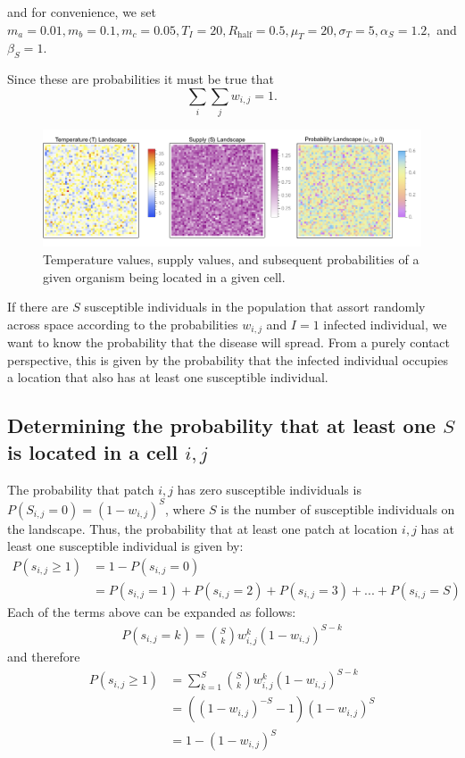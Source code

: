 \documentclass[11pt]{article}
\begin{document}
and for convenience, we set $m_a = 0.01, m_b = 0.1, m_c = 0.05, T_I = 20, R_{\text{half}} = 0.5, \mu_T = 20, \sigma_ T = 5, \alpha_S = 1.2, $ and $\beta_S = 1$. 

Since these are probabilities it must be true that 
\begin{equation}
\sum_i \sum_j w_{i,j}=1.
\end{equation}

\begin{figure}[!hpt]
    \centering
    \includegraphics[width=0.9\linewidth]{figs/temp-supply-probability-landscape.pdf}
    \caption{Temperature values, supply values, and subsequent probabilities of a given organism being located in a given cell.}
    \label{fig:t-s-wij-grid}
\end{figure}

If there are $S$ susceptible individuals in the population that assort randomly across space according to the probabilities $w_{i,j}$ and $I=1$ infected individual, we want to know the probability that the disease will spread. From a purely contact perspective, this is given by the probability that the infected individual occupies a location that also has at least one susceptible individual. 

\subsection{Determining the probability that at least one $S$ is located in a cell $i,j$}

The probability that patch $i,j$ has zero susceptible individuals is $P(S_{i,j}=0)=(1-w_{i,j})^S$, where $S$ is the number of susceptible individuals on the landscape. Thus, the probability that at least one patch at location $i,j$ has at least one susceptible individual is given by:  
\begin{align}
P(s_{i,j} \geq 1) &=1-P(s_{i,j}=0) \\
&=P(s_{i,j}=1)+P(s_{i,j}=2)+P(s_{i,j}=3)+ ... +P(s_{i,j}=S)
\end{align}
Each of the terms above can be expanded as follows: 
\begin{align}
P(s_{i,j}=k)=\binom{S}{k}w_{i,j}^k(1-w_{i,j})^{S-k}
\end{align}
and therefore
\begin{align}
P(s_{i,j} \geq 1)&=\sum_{k=1}^{S}\binom{S}{k}w_{i,j}^k(1-w_{i,j})^{S-k}\\
&=\left((1-w_{i,j})^{-S}-1\right)(1-w_{i,j})^S\\
&=1-(1-w_{i,j})^S
\end{align}
\end{document}
